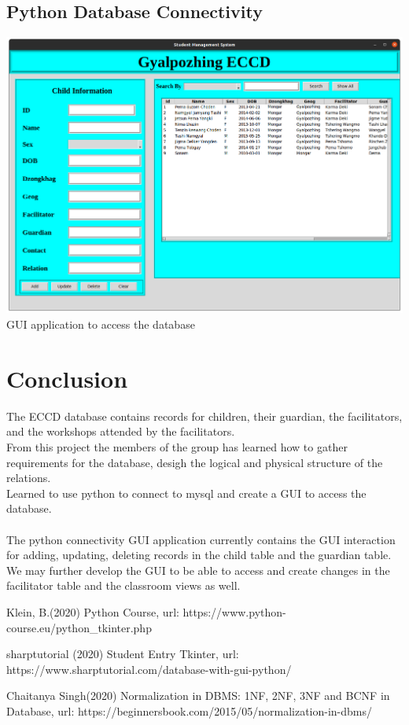 \documentclass{scrreprt}
\begin{document}
	\section{Python Database Connectivity}
	
	
	
	\includegraphics[width = \linewidth]{gui}
	GUI application to access the database
	
\chapter*{Conclusion}
	The ECCD database contains records for children, their guardian, the facilitators, and the workshops attended by the facilitators.\\From this project the members of the group has learned how to gather requirements for the database, desigh the logical and physical structure of the relations.\\Learned to use python to connect to mysql and create a GUI to access the database.\\ \\The python connectivity GUI application currently contains the GUI interaction for adding, updating, deleting records in the child table and the guardian table.\\We may further develop the GUI to be able to access and create changes in the facilitator table and the classroom views as well.  

\begin{thebibliography}{99}			 
	
	 Klein, B.(2020) Python Course, url: https://www.python-course.eu/python_tkinter.php
    
     sharptutorial (2020) Student Entry Tkinter, url: https://www.sharptutorial.com/database-with-gui-python/
	
	 Chaitanya Singh(2020) Normalization in DBMS: 1NF, 2NF, 3NF and BCNF in Database, url: https://beginnersbook.com/2015/05/normalization-in-dbms/
		

\end{thebibliography}
	
\end{document}
